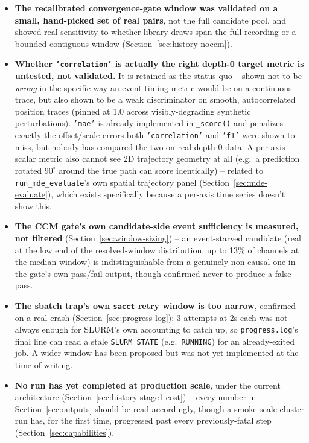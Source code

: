 \documentclass[11pt]{article}
\begin{document}
\begin{itemize}
  \item \textbf{The recalibrated convergence-gate window was validated on a small, hand-picked set of real pairs}, not the full candidate pool, and showed real sensitivity to whether library draws span the full recording or a bounded contiguous window (Section~\ref{sec:history-noccm}).
  \item \textbf{Whether \texttt{'correlation'} is actually the right depth-0 target metric is untested, not validated.} It is retained as the status quo -- shown not to be \emph{wrong} in the specific way an event-timing metric would be on a continuous trace, but also shown to be a weak discriminator on smooth, autocorrelated position traces (pinned at 1.0 across visibly-degrading synthetic perturbations). \texttt{'mae'} is already implemented in \texttt{\_score()} and penalizes exactly the offset/scale errors both \texttt{'correlation'} and \texttt{'f1'} were shown to miss, but nobody has compared the two on real depth-0 data. A per-axis scalar metric also cannot see 2D trajectory geometry at all (e.g.\ a prediction rotated $90^\circ$ around the true path can score identically) -- related to \texttt{run\_mde\_evaluate}'s own spatial trajectory panel (Section~\ref{sec:mde-evaluate}), which exists specifically because a per-axis time series doesn't show this.
  \item \textbf{The CCM gate's own candidate-side event sufficiency is measured, not filtered} (Section~\ref{sec:window-sizing}) -- an event-starved candidate (real at the low end of the resolved-window distribution, up to 13\% of channels at the median window) is indistinguishable from a genuinely non-causal one in the gate's own pass/fail output, though confirmed never to produce a false pass.
  \item \textbf{The sbatch trap's own \texttt{sacct} retry window is too narrow}, confirmed on a real crash (Section~\ref{sec:progress-log}): 3 attempts at 2s each was not always enough for SLURM's own accounting to catch up, so \texttt{progress.log}'s final line can read a stale \texttt{SLURM\_STATE} (e.g.\ \texttt{RUNNING}) for an already-exited job. A wider window has been proposed but was not yet implemented at the time of writing.
  \item \textbf{No run has yet completed at production scale}, under the current architecture (Section~\ref{sec:history-stage1-cost}) -- every number in Section~\ref{sec:outputs} should be read accordingly, though a smoke-scale cluster run has, for the first time, progressed past every previously-fatal step (Section~\ref{sec:capabilities}).
\end{itemize}
\end{document}
